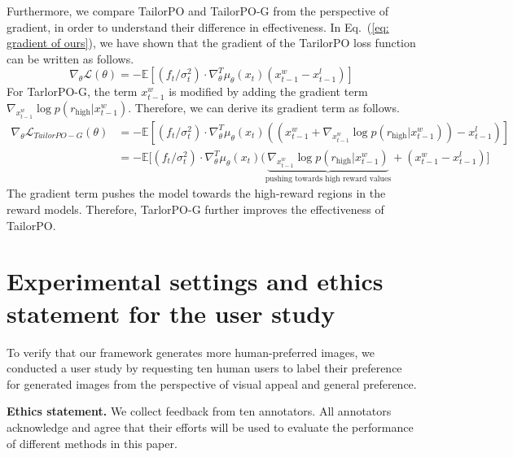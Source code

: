 Furthermore, we compare TailorPO and TailorPO-G from the perspective of gradient, in order to understand their difference in effectiveness.
In Eq.~(\ref{eq: gradient of ours}), we have shown that the gradient of the TarilorPO loss function can be written as follows.
\begin{equation*}
\nabla_\theta \mathcal{L}(\theta) = -\mathbb{E}\left[(f_t/{\sigma^2_{t}})\cdot\nabla^T_\theta\mu_\theta(x_{t})(x^w_{t-1} - x^l_{t-1})\right]
\end{equation*}
For TarlorPO-G, the term $x^w_{t-1}$ is modified by adding the gradient term $\nabla_{x^w_{t-1}}\log p(r_{\text{high}}|x^w_{t-1})$. Therefore, we can derive its gradient term as follows.
\begin{equation}
\begin{aligned}
\nabla_\theta \mathcal{L}_{TailorPO-G}(\theta) & = -\mathbb{E}\left[(f_t/{\sigma^2_{t}})\cdot\nabla^T_\theta\mu_\theta(x_{t})((x^w_{t-1} +  \nabla_{x^w_{t-1}}\log p(r_\text{high} | x^w_{t-1}))- x^l_{t-1})\right] \\
&= -\mathbb{E}\Big[(f_t/{\sigma^2_{t}})\cdot\nabla^T_\theta\mu_\theta(x_{t})(\underbrace{\nabla_{x^w_{t-1}}\log p(r_\text{high} | x^w_{t-1})}_{\text{pushing towards high reward values}} + (x^w_{t-1} - x^l_{t-1})\Big]
\end{aligned}
\end{equation}
The gradient term pushes the model towards the high-reward regions in the reward models. Therefore, TarlorPO-G further improves the effectiveness of TailorPO. 


\section{Experimental settings and ethics statement for the user study}
\label{sec: app_user_study}

To verify that our framework generates more human-preferred images, we conducted a user study by requesting ten human users to label their preference for generated images from the perspective of visual appeal and general preference.

\textbf{Ethics statement. }
We collect feedback from ten annotators. All annotators acknowledge and agree that their efforts will be used to evaluate the performance of different methods in this paper.

